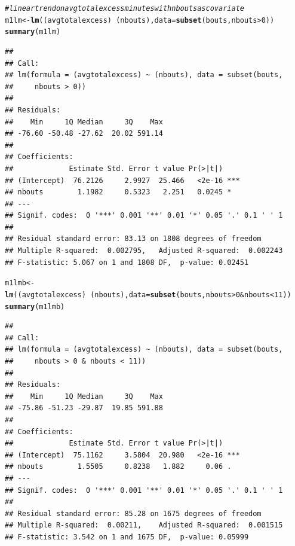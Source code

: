 \documentclass[11pt]{article}\usepackage[]{graphicx}\usepackage[]{color}
\makeatletter
\newcommand{\hlnum}[1]{\textcolor[rgb]{0.686,0.059,0.569}{#1}}%
\newcommand{\hlcom}[1]{\textcolor[rgb]{0.678,0.584,0.686}{\textit{#1}}}%
\newcommand{\hlopt}[1]{\textcolor[rgb]{0,0,0}{#1}}%
\newcommand{\hlstd}[1]{\textcolor[rgb]{0.345,0.345,0.345}{#1}}%
\newcommand{\hlkwb}[1]{\textcolor[rgb]{0.69,0.353,0.396}{#1}}%
\newcommand{\hlkwc}[1]{\textcolor[rgb]{0.333,0.667,0.333}{#1}}%
\newcommand{\hlkwd}[1]{\textcolor[rgb]{0.737,0.353,0.396}{\textbf{#1}}}%
\newenvironment{kframe}{%
 \def\at@end@of@kframe{}%
 \ifinner\ifhmode%
  \def\at@end@of@kframe{\end{minipage}}%
  \begin{minipage}{\columnwidth}%
 \fi\fi%
 \def\FrameCommand##1{\hskip\@totalleftmargin \hskip-\fboxsep
 \colorbox{shadecolor}{##1}\hskip-\fboxsep
     \hskip-\linewidth \hskip-\@totalleftmargin \hskip\columnwidth}%
 \MakeFramed {\advance\hsize-\width
   \@totalleftmargin\z@ \linewidth\hsize
   \@setminipage}}%
 {\par\unskip\endMakeFramed%
 \at@end@of@kframe}
\newenvironment{knitrout}{}{} %
\makeatother
\begin{document}
\begin{knitrout}
\color{fgcolor}\begin{kframe}
\begin{alltt}
\hlcom{#linear trend on  avgtotalexcess minutes with nbouts as covariate}
\hlstd{m1lm} \hlkwb{<-} \hlkwd{lm}\hlstd{((avgtotalexcess)}\hlopt{~}\hlstd{(nbouts),}\hlkwc{data}\hlstd{=}\hlkwd{subset}\hlstd{(bouts,nbouts}\hlopt{>}\hlnum{0}\hlstd{))}
\hlkwd{summary}\hlstd{(m1lm)}
\end{alltt}
\begin{verbatim}
## 
## Call:
## lm(formula = (avgtotalexcess) ~ (nbouts), data = subset(bouts, 
##     nbouts > 0))
## 
## Residuals:
##    Min     1Q Median     3Q    Max 
## -76.60 -50.48 -27.62  20.02 591.14 
## 
## Coefficients:
##             Estimate Std. Error t value Pr(>|t|)    
## (Intercept)  76.2126     2.9927  25.466   <2e-16 ***
## nbouts        1.1982     0.5323   2.251   0.0245 *  
## ---
## Signif. codes:  0 '***' 0.001 '**' 0.01 '*' 0.05 '.' 0.1 ' ' 1
## 
## Residual standard error: 83.13 on 1808 degrees of freedom
## Multiple R-squared:  0.002795,	Adjusted R-squared:  0.002243 
## F-statistic: 5.067 on 1 and 1808 DF,  p-value: 0.02451
\end{verbatim}
\begin{alltt}
\hlstd{m1lmb} \hlkwb{<-} \hlkwd{lm}\hlstd{((avgtotalexcess)}\hlopt{~}\hlstd{(nbouts),}\hlkwc{data}\hlstd{=}\hlkwd{subset}\hlstd{(bouts,nbouts}\hlopt{>}\hlnum{0}\hlopt{&}\hlstd{nbouts}\hlopt{<}\hlnum{11}\hlstd{))}
\hlkwd{summary}\hlstd{(m1lmb)}
\end{alltt}
\begin{verbatim}
## 
## Call:
## lm(formula = (avgtotalexcess) ~ (nbouts), data = subset(bouts, 
##     nbouts > 0 & nbouts < 11))
## 
## Residuals:
##    Min     1Q Median     3Q    Max 
## -75.86 -51.23 -29.87  19.85 591.88 
## 
## Coefficients:
##             Estimate Std. Error t value Pr(>|t|)    
## (Intercept)  75.1162     3.5804  20.980   <2e-16 ***
## nbouts        1.5505     0.8238   1.882     0.06 .  
## ---
## Signif. codes:  0 '***' 0.001 '**' 0.01 '*' 0.05 '.' 0.1 ' ' 1
## 
## Residual standard error: 85.28 on 1675 degrees of freedom
## Multiple R-squared:  0.00211,	Adjusted R-squared:  0.001515 
## F-statistic: 3.542 on 1 and 1675 DF,  p-value: 0.05999
\end{verbatim}
\end{kframe}
\end{knitrout}
\end{document}
